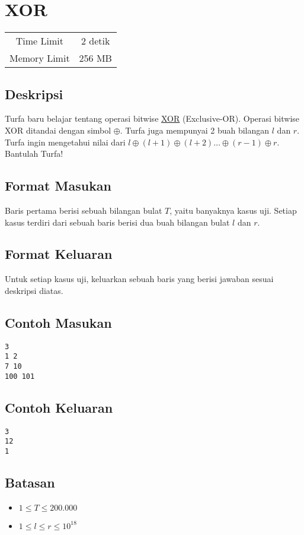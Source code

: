 \documentclass{article}
\begin{document}
\section*{\hfil XOR\hfil}

\begin{center}
\begin{tabular}{ |cc| } 
 \hline
 Time Limit & 2 detik \\ 
 Memory Limit & 256 MB \\
 \hline
\end{tabular}
\end{center}

\subsection*{Deskripsi}
\par Turfa baru belajar tentang operasi bitwise \href{https://en.wikipedia.org/wiki/Exclusive_or}{XOR} (Exclusive-OR). Operasi bitwise XOR ditandai dengan simbol $\oplus$. Turfa juga mempunyai 2 buah bilangan $l$ dan $r$. Turfa ingin mengetahui nilai dari $l \oplus (l + 1) \oplus (l + 2) \dots \oplus (r - 1) \oplus r$. Bantulah Turfa!

\subsection*{Format Masukan}
\par Baris pertama berisi sebuah bilangan bulat $T$, yaitu banyaknya kasus uji.
\newline Setiap kasus terdiri dari sebuah baris berisi dua buah bilangan bulat $l$ dan $r$.

\subsection*{Format Keluaran}

\par Untuk setiap kasus uji, keluarkan sebuah baris yang berisi jawaban sesuai deskripsi diatas. 

\subsection*{Contoh Masukan}

\begin{lstlisting}
3
1 2
7 10
100 101

\end{lstlisting}

\subsection*{Contoh Keluaran}

\begin{lstlisting}
3
12
1

\end{lstlisting}

\subsection*{Batasan}

\begin{itemize}
	\item $1 \leq T\leq 200.000$
	\item $1 \leq l \leq r \leq 10^{18}$
\end{itemize}
\end{document}
